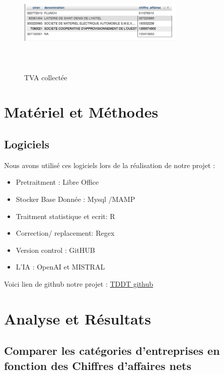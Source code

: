 \documentclass[mstat,12pt]{unswthesis}
\begin{document}
\begin{figure}
\centering
\includegraphics[width=8cm,height=5cm]{image_sql/tva_collecte.png}
\caption{TVA collectée}
\end{figure}

\newpage

\chapter{Matériel et Méthodes}\label{matuxe9riel-et-muxe9thodes}

\section{Logiciels}\label{logiciels}

Nous avons utilisé ces logiciels lors de la réalisation de notre projet
:

\begin{itemize}
\tightlist
\item
  Pretraitment : Libre Office
\item
  Stocker Base Donnée : Mysql /MAMP
\item
  Traitment statistique et ecrit: R
\item
  Correction/ replacement: Regex
\item
  Version control : GitHUB
\item
  L'IA : OpenAI et MISTRAL
\end{itemize}

\bigskip

Voici lien de github notre projet :
\href{https://github.com/serdarvarl/Project_DataBase_FR.git}{TDDT github}

\chapter{Analyse et Résultats}\label{analyse-et-ruxe9sultats}

\section{\texorpdfstring{\textbf{Comparer les catégories d'entreprises
en fonction des Chiffres d'affaires
nets}}{Comparer les catégories d'entreprises en fonction des Chiffres d'affaires nets}}\label{comparer-les-catuxe9gories-dentreprises-en-fonction-des-chiffres-daffaires-nets}
\end{document}
